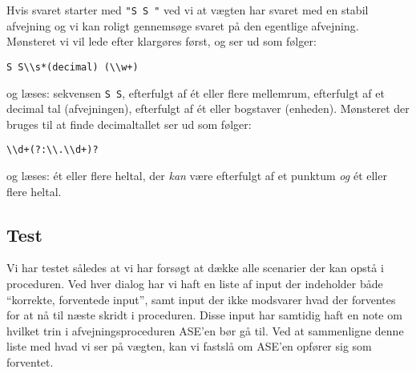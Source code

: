 \documentclass[a4paper]{article}
\begin{document}
Hvis svaret starter med \texttt{"S S "} ved vi at vægten har svaret med en stabil afvejning og vi kan roligt gennemsøge svaret på den egentlige afvejning. Mønsteret vi vil lede efter klargøres først, og ser ud som følger:

\begin{verbatim}
S S\\s*(decimal) (\\w+)
\end{verbatim}

og læses: sekvensen \texttt{S S}, efterfulgt af ét eller flere mellemrum, efterfulgt af et decimal tal (afvejningen), efterfulgt af ét eller bogstaver (enheden). Mønsteret der bruges til at finde decimaltallet ser ud som følger:
\begin{verbatim}
\\d+(?:\\.\\d+)? 
\end{verbatim}
og læses: ét eller flere heltal, der \emph{kan} være efterfulgt af et punktum \emph{og} ét eller flere heltal.



\subsection{Test} %

Vi har testet således at vi har forsøgt at dække alle scenarier der kan opstå i proceduren. Ved hver dialog har vi haft en liste af input der indeholder både ``korrekte, forventede input'', samt input der ikke modsvarer hvad der forventes for at nå til næste skridt i proceduren. Disse input har samtidig haft en note om hvilket trin i afvejningsproceduren ASE'en bør gå til. Ved at sammenligne denne liste med hvad vi ser på vægten, kan vi fastslå om ASE'en opfører sig som forventet.
\end{document}
